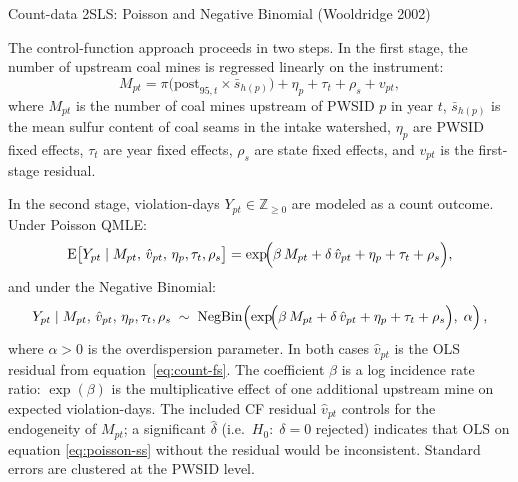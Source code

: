 \documentclass{beamer}
\begin{document}
\begin{frame}{Count-data 2SLS: Poisson and Negative Binomial (Wooldridge 2002)}

The control-function approach proceeds in two steps. In the first stage,
the number of upstream coal mines is regressed linearly on the instrument:
%
\begin{equation}
    M_{pt} = \pi \bigl(\mathrm{post}_{95,t} \times \bar{s}_{h(p)}\bigr)
             + \eta_p + \tau_t + \rho_s + v_{pt},
    \label{eq:count-fs}
\end{equation}
%
where $M_{pt}$ is the number of coal mines upstream of PWSID $p$ in year $t$,
$\bar{s}_{h(p)}$ is the mean sulfur content of coal seams in the intake
watershed, $\eta_p$ are PWSID fixed effects, $\tau_t$ are year fixed effects,
$\rho_s$ are state fixed effects, and $v_{pt}$ is the first-stage residual.

In the second stage, violation-days $Y_{pt} \in \mathbb{Z}_{\geq 0}$ are
modeled as a count outcome. Under Poisson QMLE:
%
\begin{equation}
    \mathrm{E}\bigl[Y_{pt} \mid M_{pt},\, \hat{v}_{pt},\, \eta_p, \tau_t,
    \rho_s\bigr]
    = \exp\!\Bigl(\beta\, M_{pt} + \delta\, \hat{v}_{pt}
                 + \eta_p + \tau_t + \rho_s\Bigr),
    \label{eq:poisson-ss}
\end{equation}
%
and under the Negative Binomial:
%
\begin{equation}
    Y_{pt} \mid M_{pt},\, \hat{v}_{pt},\, \eta_p, \tau_t, \rho_s
    \;\sim\; \mathrm{NegBin}\!\left(
        \exp\!\Bigl(\beta\, M_{pt} + \delta\, \hat{v}_{pt}
                   + \eta_p + \tau_t + \rho_s\Bigr),\; \alpha
    \right),
    \label{eq:negbin-ss}
\end{equation}
%
where $\alpha > 0$ is the overdispersion parameter. In both cases $\hat{v}_{pt}$
is the OLS residual from equation~\eqref{eq:count-fs}. The coefficient $\beta$
is a log incidence rate ratio: $\exp(\beta)$ is the multiplicative effect of one
additional upstream mine on expected violation-days. The included CF residual
$\hat{v}_{pt}$ controls for the endogeneity of $M_{pt}$; a significant $\hat\delta$
(i.e.\ $H_0{:}\;\delta = 0$ rejected) indicates that OLS on equation
\eqref{eq:poisson-ss} without the residual would be inconsistent.
Standard errors are clustered at the PWSID level.
\end{frame}

\begin{frame}{}

\end{frame}

\begin{frame}{}

\end{frame}

\begin{frame}{}

\end{frame}

\begin{frame}{}

\end{frame}
\end{document}
